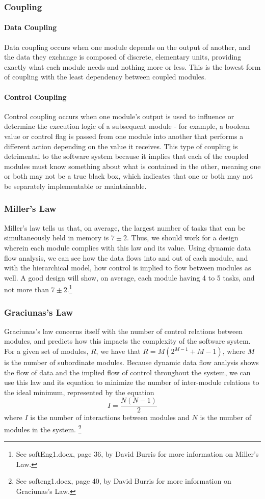 \documentclass{article}
\begin{document}
		\subsubsection{Coupling}
			\paragraph{Data Coupling}
				Data coupling occurs when one module depends on the output of another, and the data they exchange is composed of discrete, elementary units, providing exactly what each module needs and nothing more or less. This is the lowest form of coupling with the least dependency between coupled modules. 
			\paragraph{Control Coupling}
				Control coupling occurs when one module's output is used to influence or determine the execution logic of a subsequent module - for example, a boolean value or control flag is passed from one module into another that performs a different action depending on the value it receives. This type of coupling is detrimental to the software system because it implies that each of the coupled modules must know something about what is contained in the other, meaning one or both may not be a true black box, which indicates that one or both may not be separately implementable or maintainable. 
		\subsubsection{Miller's Law}
			Miller's law tells us that, on average, the largest number of tasks that can be simultaneously held in memory is $7\pm2$. Thus, we should work for a design wherein each module complies with this law and its value. Using dynamic data flow analysis, we can see how the data flows into and out of each module, and with the hierarchical model, how control is implied to flow between modules as well. A good design will show, on average, each module having 4 to 5 tasks, and not more than $7\pm2$.\footnote{See softEng1.docx, page 36, by David Burris for more information on Miller's Law.}  
		\subsubsection{Graciunas's Law}
			Graciunas's law concerns itself with the number of control relations between modules, and predicts how this impacts the complexity of the software system. For a given set of modules, $R$, we have that $R = M(2^{M-1} + M - 1)$, where $M$ is the number of subordinate modules. Because dynamic data flow analysis shows the flow of data and the implied flow of control throughout the system, we can use this law and its equation to minimize the number of inter-module relations to the ideal minimum, represented by the equation 
			$$I = \frac{N(N - 1)}{2}$$
			where $I$ is the number of interactions between modules and $N$ is the number of modules in the system. \footnote{See softeng1.docx, page 40, by David Burris for more information on Graciunas's Law.}
\end{document}
